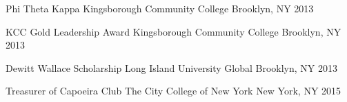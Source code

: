 



\begin{cvhonors}

  \cvhonor
    {Phi Theta Kappa} %
    {Kingsborough Community College} %
    {Brooklyn, NY} %
    {2013} %

	\iffalse
  \cvhonor
    {Finalist} %
    {DEFCON 21st CTF Hacking Competition World Final} %
    {Las Vegas, U.S.A} %
    {2013} %
\fi

  \cvhonor
    {KCC Gold Leadership Award} %
    {Kingsborough Community College} %
    {Brooklyn, NY} %
    {2013} %

  \cvhonor
    {Dewitt Wallace Scholarship} %
    {Long Island University Global} %
    {Brooklyn, NY} %
    {2013} %

  \cvhonor
    {Treasurer of Capoeira Club} %
    {The City College of New York} %
    {New York, NY} %
    {2015} %

\end{cvhonors}

